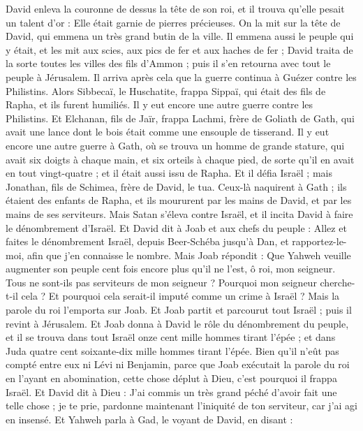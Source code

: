 \begin{multicols}{2}
David enleva la couronne de dessus la tête de son roi, et il trouva qu'elle pesait un talent d'or : Elle était garnie de pierres précieuses. On la mit sur la tête de David, qui emmena un très grand butin de la ville.
Il emmena aussi le peuple qui y était, et les mit aux scies, aux pics de fer et aux haches de fer ; David traita de la sorte toutes les villes des fils d’Ammon ; puis il s'en retourna avec tout le peuple à Jérusalem.
Il arriva après cela que la guerre continua à Guézer contre les Philistins. Alors Sibbecaï, le Huschatite, frappa Sippaï, qui était des fils de Rapha, et ils furent humiliés.
Il y eut encore une autre guerre contre les Philistins. Et Elchanan, fils de Jaïr, frappa Lachmi, frère de Goliath de Gath, qui avait une lance dont le bois était comme une ensouple de tisserand.
Il y eut encore une autre guerre à Gath, où se trouva un homme de grande stature, qui avait six doigts à chaque main, et six orteils à chaque pied, de sorte qu'il en avait en tout vingt-quatre ; et il était aussi issu de Rapha.
Et il défia Israël ; mais Jonathan, fils de Schimea, frère de David, le tua.
Ceux-là naquirent à Gath ; ils étaient des enfants de Rapha, et ils moururent par les mains de David, et par les mains de ses serviteurs.
\VerseOne{}Mais Satan s'éleva contre Israël, et il incita David à faire le dénombrement d'Israël.
Et David dit à Joab et aux chefs du peuple : Allez et faites le dénombrement Israël, depuis Beer-Schéba jusqu'à Dan, et rapportez-le-moi, afin que j’en connaisse le nombre.
Mais Joab répondit : Que Yahweh veuille augmenter son peuple cent fois encore plus qu'il ne l’est, ô roi, mon seigneur. Tous ne sont-ils pas serviteurs de mon seigneur ? Pourquoi mon seigneur cherche-t-il cela ? Et pourquoi cela serait-il imputé comme un crime à Israël ?
Mais la parole du roi l'emporta sur Joab. Et Joab partit et parcourut tout Israël ; puis il revint à Jérusalem.
Et Joab donna à David le rôle du dénombrement du peuple, et il se trouva dans tout Israël onze cent mille hommes tirant l'épée ; et dans Juda quatre cent soixante-dix mille hommes tirant l'épée.
Bien qu'il n'eût pas compté entre eux ni Lévi ni Benjamin, parce que Joab exécutait la parole du roi en l’ayant en abomination,
cette chose déplut à Dieu, c'est pourquoi il frappa Israël.
Et David dit à Dieu : J'ai commis un très grand péché d'avoir fait une telle chose ; je te prie, pardonne maintenant l'iniquité de ton serviteur, car j'ai agi en insensé.
Et Yahweh parla à Gad, le voyant de David, en disant :

\end{multicols}
